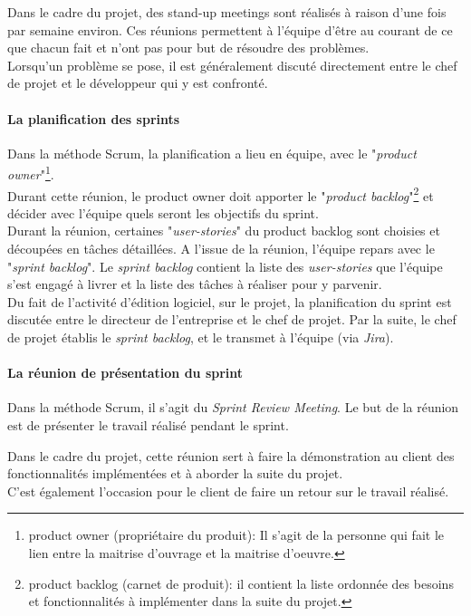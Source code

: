 Dans le cadre du projet, des stand-up meetings sont réalisés à raison d'une fois par semaine environ. Ces réunions permettent à l'équipe d'être au courant de ce que chacun fait et n'ont pas pour but de résoudre des problèmes.\\
Lorsqu'un problème se pose, il est généralement discuté directement entre le chef de projet et le développeur qui y est confronté.

\paragraph*{La planification des sprints\\}
Dans la méthode Scrum, la planification a lieu en équipe\cite{bib:springPlanning}, avec le "\textit{product owner}"\footnote{product owner (propriétaire du produit): Il s'agit de la personne qui fait le lien entre la maitrise d'ouvrage et la maitrise d'oeuvre.}. \\
Durant cette réunion, le product owner doit apporter le "\textit{product backlog}"\footnote{product backlog (carnet de produit): il contient la liste ordonnée des besoins et fonctionnalités à implémenter dans la suite du projet.} et décider avec l'équipe quels seront les objectifs du sprint.\\
Durant la réunion, certaines "\textit{user-stories}" du product backlog sont choisies et découpées en tâches détaillées. A l'issue de la réunion, l'équipe repars avec le "\textit{sprint backlog}". Le \textit{sprint backlog} contient la liste des \textit{user-stories} que l'équipe s'est engagé à livrer et la liste des tâches à réaliser pour y parvenir.\\

Du fait de l'activité d'édition logiciel, sur le projet, la planification du sprint est discutée entre le directeur de l'entreprise et le chef de projet. Par la suite, le chef de projet établis le \textit{sprint backlog}, et le transmet à l'équipe (via \textit{Jira}).

\paragraph*{La réunion de présentation du sprint\\}
Dans la méthode Scrum, il s'agit du \textit{Sprint Review Meeting}. Le but de la réunion est de présenter le travail réalisé pendant le sprint. 

Dans le cadre du projet, cette réunion sert à faire la démonstration au client des fonctionnalités implémentées et à aborder la suite du projet.\\
C'est également l'occasion pour le client de faire un retour sur le travail réalisé.

